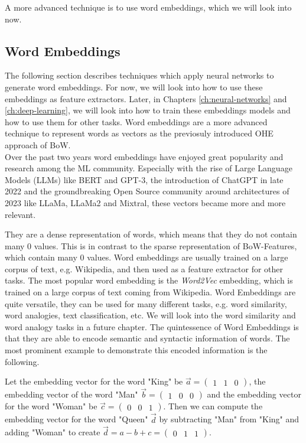 A more advanced technique is to use word embeddings, which we will look into now.
\subsection{Word Embeddings}
The following section describes techniques which apply neural networks to generate word embeddings.
For now, we will look into how to use these embeddings as feature extractors.
Later, in Chapters \ref{ch:neural-networks} and \ref{ch:deep-learning}, we will look into how to train these embeddings models and how to use them for other tasks.
Word embeddings are a more advanced technique to represent words as vectors as the previosuly introduced OHE approach of BoW.\\
Over the past two years word embeddings have enjoyed great popularity and research among the ML community.
Especially with the rise of Large Language Models (LLMs) like BERT\cite{devlin2019bert} and GPT-3\cite{brown2020language}, the introduction of ChatGPT\cite{ChatGPT:2022} in late 2022 and the groundbreaking Open Source community around architectures of 2023 like LLaMa\cite{touvron2023llama}, LLaMa2\cite{touvron2023llama2} and Mixtral\cite{mixtral:2023}, these vectors became more and more relevant.

They are a dense representation of words, which means that they do not contain many $0$ values.
This is in contrast to the sparse representation of BoW-Features, which contain many $0$ values.
Word embeddings are usually trained on a large corpus of text, e.g. Wikipedia, and then used as a feature extractor for other tasks.
The most popular word embedding is the \textit{Word2Vec} embedding, which is trained on a large corpus of text coming from Wikipedia.
Word Embeddings are quite versatile, they can be used for many different tasks, e.g. word similarity, word analogies, text classification, etc.
We will look into the word similarity and word analogy tasks in a future chapter.
The quintessence of Word Embeddings is that they are able to encode semantic and syntactic information of words.
The most prominent example to demonstrate this encoded information is the following.

Let the embedding vector for the word "King" be $\vec{a} = \begin{pmatrix}1 & 1 & 0\end{pmatrix}$, the embedding vector of the word "Man" $\vec{b} = \begin{pmatrix}1 & 0 & 0\end{pmatrix}$ and the embedding vector for the word "Woman" be $\vec{c} = \begin{pmatrix}0 & 0 & 1\end{pmatrix}$.
  Then we can compute the embedding vector for the word "Queen" $\vec{d}$ by subtracting "Man" from "King" and adding "Woman" to create $\vec{d} = a - b + c = \begin{pmatrix}0 & 1 & 1\end{pmatrix}$.

